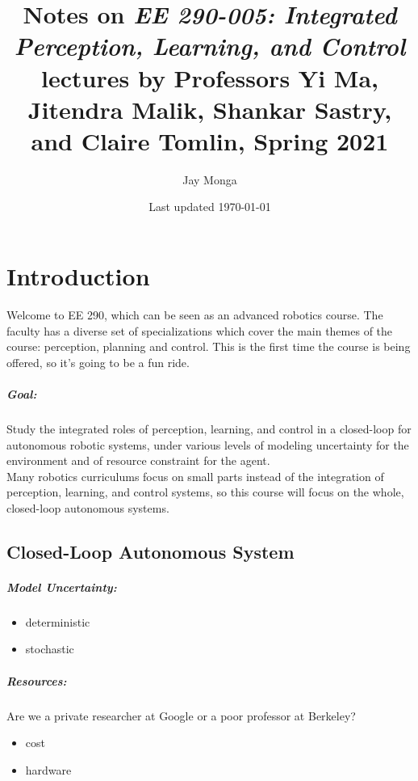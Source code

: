 \documentclass{report}
\begin{document}
\title{Notes on \textit{EE 290-005: Integrated Perception, Learning, and Control} lectures by Professors Yi Ma, Jitendra Malik, Shankar Sastry, and Claire Tomlin, Spring 2021}
\author{Jay Monga}
\date{Last updated \today}
\maketitle

\tableofcontents

\chapter{Introduction}
Welcome to EE 290, which can be seen as an advanced robotics course.
The faculty has a diverse set of specializations which cover the main themes of the course: perception, planning and control.
This is the first time the course is being offered, so it's going to be a fun ride.
\paragraph{Goal:} Study the integrated roles of perception, learning, and control in a closed-loop for autonomous robotic systems, under various levels of modeling uncertainty for the environment and of resource constraint for the agent.\\
Many robotics curriculums focus on small parts instead of the integration of perception, learning, and control systems, so this course will focus on the whole, closed-loop autonomous systems.\\

\section{Closed-Loop Autonomous System}

\paragraph{Model Uncertainty:}
\begin{itemize}
    \item deterministic
    \item stochastic
\end{itemize}

\paragraph{Resources:} Are we a private researcher at Google or a poor professor at Berkeley?
\begin{itemize}
    \item cost
    \item hardware
\end{itemize}
\end{document}
